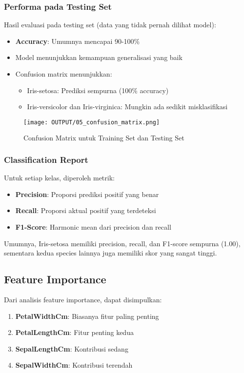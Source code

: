 \documentclass[11pt,a4paper]{article}
\begin{document}
\subsubsection{Performa pada Testing Set}
Hasil evaluasi pada testing set (data yang tidak pernah dilihat model):
\begin{itemize}
    \item \textbf{Accuracy}: Umumnya mencapai 90-100\%
    \item Model menunjukkan kemampuan generalisasi yang baik
    \item Confusion matrix menunjukkan:
    \begin{itemize}
        \item Iris-setosa: Prediksi sempurna (100\% accuracy)
        \item Iris-versicolor dan Iris-virginica: Mungkin ada sedikit misklasifikasi
    \end{itemize}
\end{itemize}

\begin{figure}[h]
    \centering
    \texttt{[image: OUTPUT/05\_confusion\_matrix.png]}
    \caption{Confusion Matrix untuk Training Set dan Testing Set}
    \label{fig:confusion_matrix}
\end{figure}

\subsubsection{Classification Report}
Untuk setiap kelas, diperoleh metrik:
\begin{itemize}
    \item \textbf{Precision}: Proporsi prediksi positif yang benar
    \item \textbf{Recall}: Proporsi aktual positif yang terdeteksi
    \item \textbf{F1-Score}: Harmonic mean dari precision dan recall
\end{itemize}

Umumnya, Iris-setosa memiliki precision, recall, dan F1-score sempurna (1.00), sementara kedua species lainnya juga memiliki skor yang sangat tinggi.

\subsection{Feature Importance}
Dari analisis feature importance, dapat disimpulkan:
\begin{enumerate}
    \item \textbf{PetalWidthCm}: Biasanya fitur paling penting
    \item \textbf{PetalLengthCm}: Fitur penting kedua
    \item \textbf{SepalLengthCm}: Kontribusi sedang
    \item \textbf{SepalWidthCm}: Kontribusi terendah
\end{enumerate}
\end{document}

